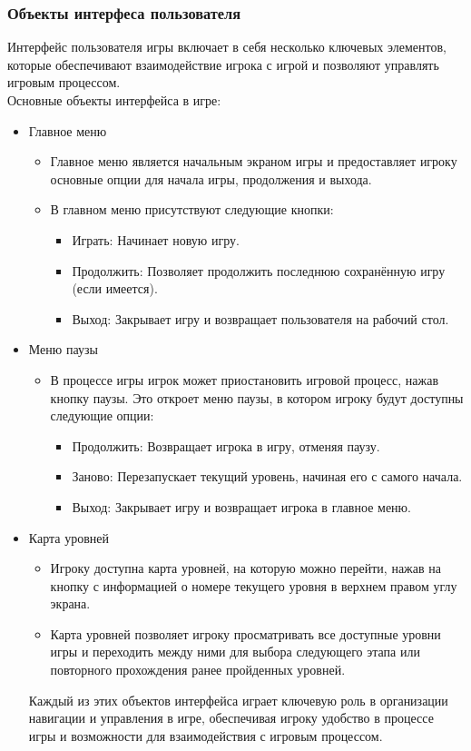 \documentclass[article,12pt, fleqn]{article}
\begin{document}
\begin{itemize}
\subsubsection{Объекты интерфеса пользователя}
Интерфейс пользователя игры включает в себя несколько ключевых элементов, которые обеспечивают взаимодействие игрока с игрой и позволяют управлять игровым процессом. \\ Основные объекты интерфейса в игре:
\begin{itemize}
    \item Главное меню
    \begin{itemize}
        \item Главное меню является начальным экраном игры и предоставляет игроку основные опции для начала игры, продолжения и выхода.
        \item В главном меню присутствуют следующие кнопки:
        \begin{itemize}
            \item Играть: Начинает новую игру.
            \item Продолжить: Позволяет продолжить последнюю сохранённую игру (если имеется).
            \item Выход: Закрывает игру и возвращает пользователя на рабочий стол.
        \end{itemize}
    \end{itemize}
    \item Меню паузы
    \begin{itemize}
        \item В процессе игры игрок может приостановить игровой процесс, нажав кнопку паузы. Это откроет меню паузы, в котором игроку будут доступны следующие опции:
        \begin{itemize}
            \item Продолжить: Возвращает игрока в игру, отменяя паузу.
            \item Заново: Перезапускает текущий уровень, начиная его с самого начала.
            \item Выход: Закрывает игру и возвращает игрока в главное меню.
        \end{itemize}
    \end{itemize}
    \item Карта уровней
    \begin{itemize}
            \item Игроку доступна карта уровней, на которую можно перейти, нажав на кнопку с информацией о номере текущего уровня в верхнем правом углу экрана.
            \item Карта уровней позволяет игроку просматривать все доступные уровни игры и переходить между ними для выбора следующего этапа или повторного прохождения ранее пройденных уровней.
    \end{itemize}
Каждый из этих объектов интерфейса играет ключевую роль в организации навигации и управления в игре, обеспечивая игроку удобство в процессе игры и возможности для взаимодействия с игровым процессом.
\end{itemize}


\end{itemize}
\end{document}
